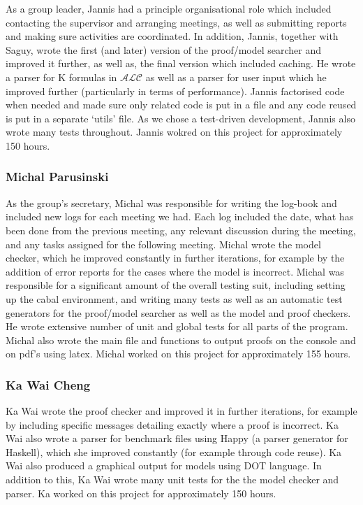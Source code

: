 As a group leader, Jannis had a principle organisational role which included contacting the supervisor and arranging meetings, as well as submitting reports and making sure activities are coordinated. In addition, Jannis, together with Saguy, wrote the first (and later) version of the proof/model searcher and improved it further, as well as, the final version which included caching. He wrote a parser for K formulas in $\mathcal{ALC}$ as well as a parser for user input which he improved further (particularly in terms of performance). Jannis factorised code when needed and made sure only related code is put in a file and any code reused is put in a separate `utils' file. As we chose a test-driven development, Jannis also wrote many tests throughout. Jannis wokred on this project for approximately 150 hours. 

\subsubsection*{Michal Parusinski}

As the group's secretary, Michal was responsible for writing the log-book and included new logs for each meeting we had. Each log included the date, what has been done from the previous meeting, any relevant discussion during the meeting, and any tasks assigned for the following meeting. Michal wrote the model checker, which he improved constantly in further iterations, for example by the addition of error reports for the cases where the model is incorrect. Michal was responsible for a significant amount of the overall testing suit, including setting up the cabal environment, and writing many tests as well as an automatic test generators for the proof/model searcher as well as the model and proof checkers. He wrote extensive number of unit and global tests for all parts of the program. Michal also wrote the main file and functions to output proofs on the console and on pdf's using latex. Michal worked on this project for approximately 155 hours.

\subsubsection*{Ka Wai Cheng}

Ka Wai wrote the proof checker and improved it in further iterations, for example by including specific messages detailing exactly where a proof is incorrect. Ka Wai also wrote a parser for benchmark files using Happy (a parser generator for Haskell), which she improved constantly (for example through code reuse). Ka Wai also produced a graphical output for models using DOT language. In addition to this, Ka Wai wrote many unit tests for the the model checker and parser.  Ka worked on this project for approximately 150 hours. 

